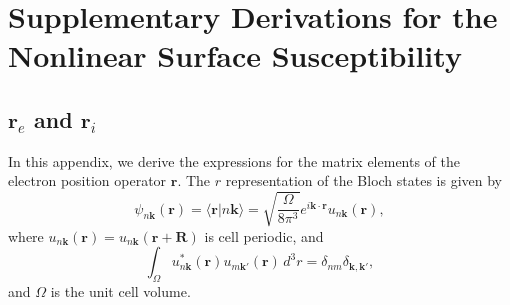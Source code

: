 \chapter{Supplementary Derivations for the Nonlinear Surface Susceptibility}
\label{app:chi2deriv}
\partialtoc



\section{\texorpdfstring{$\mathbf{r}_{e}$ and $\mathbf{r}_{i}$}{re and ri}}
\label{app:re_ri}

In this appendix, we derive the expressions for the matrix elements of the
electron position operator $\mathbf{r}$. The $r$ representation of the Bloch
states is given by
\begin{equation}\label{bloch}
\psi_{n\mathbf{k}}(\mathbf{r})=\langle\mathbf{r}\vert n\mathbf{k}\rangle =
\sqrt{\frac{\Omega}{8\pi^{3}}}
e^{i\mathbf{k} \cdot \mathbf{r}}u_{n\mathbf{k}}(\mathbf{r}),
\end{equation}
where $u_{n\mathbf{k}}(\mathbf{r}) = u_{n\mathbf{k}}(\mathbf{r} + \mathbf{R})$
is cell periodic, and
\begin{equation}\label{normal}
\int_{\Omega}
u_{n\mathbf{k}}^{*}(\mathbf{r})u_{m\mathbf{k}'}(\mathbf{r})\,d^{3}r
= \delta_{nm}\delta_{\mathbf{\mathbf{k},\mathbf{k}'}},
\end{equation}
and $\Omega$ is the unit cell volume.

